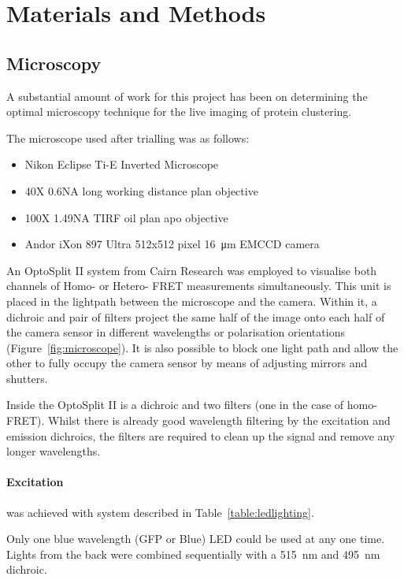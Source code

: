 \documentclass[../main.tex]{subfiles}
\begin{document}
\section{Materials and Methods}

\subsection{Microscopy}

A substantial amount of work for this project has been on determining the optimal microscopy technique for the live imaging of protein clustering.

The microscope used after trialling was as follows:

\begin{itemize}
\item{Nikon Eclipse Ti-E Inverted Microscope}
\item{40X 0.6NA long working distance plan objective}
\item{100X 1.49NA TIRF oil plan apo objective}
\item{Andor iXon 897 Ultra 512x512 pixel \SI{16}{\micro\meter} EMCCD camera}
\end{itemize}

An OptoSplit II system from Cairn Research was employed to visualise both channels of Homo- or Hetero- FRET measurements simultaneously. This unit is placed in the lightpath between the microscope and the camera. Within it, a dichroic and pair of filters project the same half of the image onto each half of the camera sensor in different wavelengths or polarisation orientations (Figure~\ref{fig:microscope}). It is also possible to block one light path and allow the other to fully occupy the camera sensor by means of adjusting mirrors and shutters.

Inside the OptoSplit II is a dichroic and two filters (one in the case of homo-FRET). Whilst there is already good wavelength filtering by the excitation and emission dichroics, the filters are required to clean up the signal and remove any longer wavelengths.

\paragraph{Excitation} was achieved with system described in Table~\ref{table:ledlighting}.

Only one blue wavelength (GFP or Blue) LED could be used at any one time. Lights from the back were combined sequentially with a \SI{515}{\nano\meter} and \SI{495}{\nano\meter} dichroic.
\end{document}
